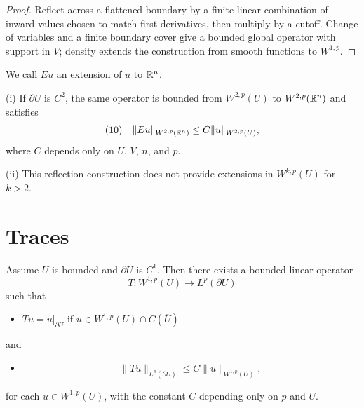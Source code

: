 \begin{proof}
\sketch Reflect across a flattened boundary by a finite linear combination of inward values chosen to match first derivatives, then multiply by a cutoff. Change of variables and a finite boundary cover give a bounded global operator with support in $V$; density extends the construction from smooth functions to $W^{1,p}$.
\end{proof}

\begin{definition}
\label{def:extension-of-sobolev-function}

We call $Eu$ an extension of $u$ to $\mathbb{R}^n$.
\end{definition}

\begin{remark}
\label{rem:extension-higher-order-remark}

(i) If $\partial U$ is $C^2$, the same operator is bounded from $W^{2,p}(U)$ to $W^{2,p}(\mathbb{R}^n)$ and satisfies
$$(10) \quad \|Eu\|_{W^{2,p}(\mathbb{R}^n)} \le C\|u\|_{W^{2,p}(U)},$$
where $C$ depends only on $U$, $V$, $n$, and $p$.

(ii) This reflection construction does not provide extensions in $W^{k,p}(U)$ for $k>2$.
\end{remark}

\section{Traces}
\label{sec:sobolev-traces}

\begin{theorem}
\label{thm:trace-theorem}

Assume $U$ is bounded and $\partial U$ is $C^1$. Then there exists a bounded linear operator
$$T : W^{1,p}(U) \to L^p(\partial U)$$
such that
\begin{itemize}
\item[(i)] $Tu = u|_{\partial U}$ if $u \in W^{1,p}(U) \cap C(\overline{U})$
\end{itemize}
and
\begin{itemize}
\item[(ii)] $$\|Tu\|_{L^p(\partial U)} \le C\|u\|_{W^{1,p}(U)},$$
\end{itemize}
for each $u \in W^{1,p}(U)$, with the constant $C$ depending only on $p$ and $U$.
\end{theorem}

